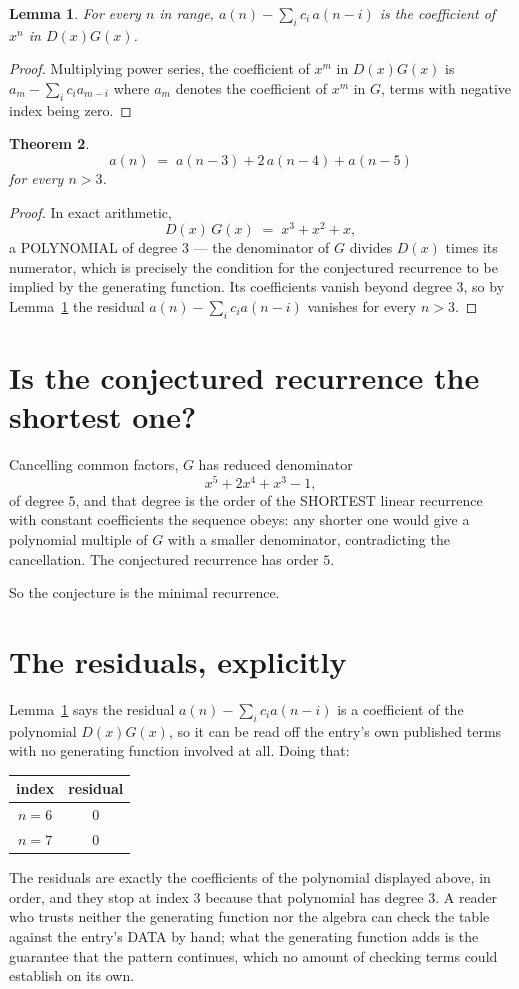 \documentclass[11pt,a4paper]{article}
\theoremstyle{plain}
\newtheorem{theorem}{Theorem}
\newtheorem{lemma}[theorem]{Lemma}
\theoremstyle{definition}
\begin{document}
\begin{lemma}\label{lem:key}
For every $n$ in range, $a(n)-\sum_i c_i\,a(n-i)$ is the coefficient of $x^{n}$ in
$D(x)G(x)$.
\end{lemma}

\begin{proof}
Multiplying power series, the coefficient of $x^{m}$ in $D(x)G(x)$ is
$a_m-\sum_i c_i a_{m-i}$ where $a_m$ denotes the coefficient of $x^{m}$ in $G$, terms with
negative index being zero.
\end{proof}

\begin{theorem}
\[
a(n)\;=\;a(n-3) + 2\,a(n-4) + a(n-5)
\]
for every $n>3$.
\end{theorem}

\begin{proof}
In exact arithmetic,
\[
D(x)\,G(x)\;=\;x^{3} + x^{2} + x,
\]
a POLYNOMIAL of degree $3$ --- the denominator of $G$ divides $D(x)$ times its numerator,
which is precisely the condition for the conjectured recurrence to be implied by the
generating function. Its coefficients vanish beyond degree $3$, so by
Lemma~\ref{lem:key} the residual $a(n)-\sum_ic_ia(n-i)$ vanishes for every
$n>3$.
\end{proof}

\section{Is the conjectured recurrence the shortest one?}

Cancelling common factors, $G$ has reduced denominator
\[
x^{5} + 2 x^{4} + x^{3} - 1,
\]
of degree $5$, and that degree is the order of the SHORTEST linear recurrence with
constant coefficients the sequence obeys: any shorter one would give a polynomial multiple of
$G$ with a smaller denominator, contradicting the cancellation. The conjectured recurrence has
order $5$.

So the conjecture is the minimal recurrence.

\section{The residuals, explicitly}

Lemma~\ref{lem:key} says the residual $a(n)-\sum_ic_ia(n-i)$ is a coefficient of the
polynomial $D(x)G(x)$, so it can be read off the entry's own published terms with no
generating function involved at all. Doing that:
\begin{center}
\begin{tabular}{cc}
index & residual \\ \hline
$n=6$ & $0$ \\
$n=7$ & $0$
\end{tabular}
\end{center}
The residuals are exactly the coefficients of the polynomial displayed above, in order, and
they stop at index $3$ because that polynomial has degree $3$. A reader who trusts
neither the generating function nor the algebra can check the table against the entry's DATA
by hand; what the generating function adds is the guarantee that the pattern continues, which
no amount of checking terms could establish on its own.
\end{document}
